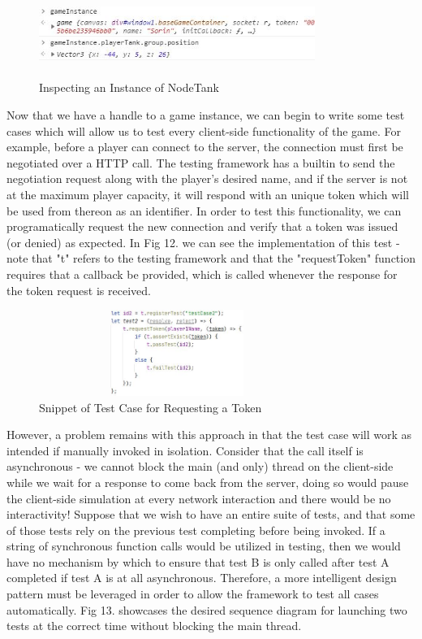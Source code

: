 \documentclass[conference]{IEEEtran}
\begin{document}
\begin{figure}[htbp]
\centerline{\includegraphics [width = 9cm, height = 2.8cm] {GameInspection.jpg}}
\caption{Inspecting an Instance of NodeTank}
\end{figure}

Now that we have a handle to a game instance, we can begin to write some test cases which will allow us to test every client-side functionality of the game. For example, before a player can
connect to the server, the connection must first be negotiated over a HTTP call. The testing framework has a builtin to send the negotiation request along with the player's desired name, and if the 
server is not at the maximum player capacity, it will respond with an unique token which will be used from thereon as an identifier. In order to test this functionality, we can programatically request
the new connection and verify that a token was issued (or denied) as expected. In Fig 12. we can see the implementation of this test - note that "t" refers to the testing framework and that the "requestToken"
function requires that a callback be provided, which is called whenever the response for the token request is received. 

\begin{figure}[htbp]
\centerline{\includegraphics [width = 9cm, height = 2.8cm] {TokenTestSnippet.jpg}}
\caption{Snippet of Test Case for Requesting a Token}
\end{figure}

However, a problem remains with this approach in that the test case will work as intended if manually invoked in isolation. Consider that the call itself is asynchronous - we cannot block the 
main (and only) thread on the client-side while we wait for a response to come back from the server, doing so would pause the client-side simulation at every network interaction and there would be no interactivity! 
Suppose that we wish to have an entire suite of tests, and that some of those tests rely on the previous test completing before being invoked. If a string of synchronous function calls would be utilized
in testing, then we would have no mechanism by which to ensure that test B is only called after test A completed if test A is at all asynchronous. Therefore, a more intelligent design pattern must 
be leveraged in order to allow the framework to test all cases automatically. Fig 13. showcases the desired sequence diagram for launching two tests at the correct time without blocking the main thread. 
\end{document}
